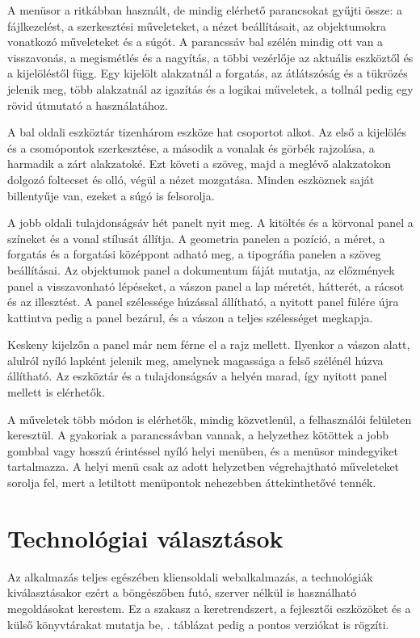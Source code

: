 A menüsor a ritkábban használt, de mindig elérhető parancsokat gyűjti össze: a fájlkezelést, a szerkesztési műveleteket, a nézet beállításait, az objektumokra vonatkozó műveleteket és a súgót. A parancssáv bal szélén mindig ott van a visszavonás, a megismétlés és a nagyítás, a többi vezérlője az aktuális eszköztől és a kijelöléstől függ. Egy kijelölt alakzatnál a forgatás, az átlátszóság és a tükrözés jelenik meg, több alakzatnál az igazítás és a logikai műveletek, a tollnál pedig egy rövid útmutató a használatához.

A bal oldali eszköztár tizenhárom eszköze hat csoportot alkot. Az első a kijelölés és a csomópontok szerkesztése, a második a vonalak és görbék rajzolása, a harmadik a zárt alakzatoké. Ezt követi a szöveg, majd a meglévő alakzatokon dolgozó foltecset és olló, végül a nézet mozgatása. Minden eszköznek saját billentyűje van, ezeket a súgó is felsorolja.

A jobb oldali tulajdonságsáv hét panelt nyit meg. A kitöltés és a körvonal panel a színeket és a vonal stílusát állítja. A geometria panelen a pozíció, a méret, a forgatás és a forgatási középpont adható meg, a tipográfia panelen a szöveg beállításai. Az objektumok panel a dokumentum fáját mutatja, az előzmények panel a visszavonható lépéseket, a vászon panel a lap méretét, hátterét, a rácsot és az illesztést. A panel szélessége húzással állítható, a nyitott panel fülére újra kattintva pedig a panel bezárul, és a vászon a teljes szélességet megkapja.

Keskeny kijelzőn a panel már nem férne el a rajz mellett. Ilyenkor a vászon alatt, alulról nyíló lapként jelenik meg, amelynek magassága a felső szélénél húzva állítható. Az eszköztár és a tulajdonságsáv a helyén marad, így nyitott panel mellett is elérhetők.

A műveletek több módon is elérhetők, mindig közvetlenül, a felhasználói felületen keresztül. A gyakoriak a parancssávban vannak, a helyzethez kötöttek a jobb gombbal vagy hosszú érintéssel nyíló helyi menüben, és a menüsor mindegyiket tartalmazza. A helyi menü csak az adott helyzetben végrehajtható műveleteket sorolja fel, mert a letiltott menüpontok nehezebben áttekinthetővé tennék.

\section{Technológiai választások}
\label{sec:technologies}

Az alkalmazás teljes egészében kliensoldali webalkalmazás, a technológiák kiválasztásakor ezért a böngészőben futó, szerver nélkül is használható megoldásokat kerestem. Ez a szakasz a keretrendszert, a fejlesztői eszközöket és a külső könyvtárakat mutatja be, . táblázat pedig a pontos verziókat is rögzíti.

